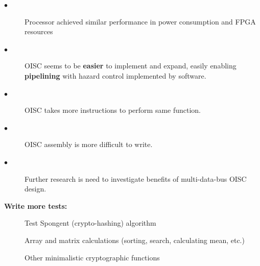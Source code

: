 \documentclass[portrait,color=UCLmidgreen,margin=1.5cm,bannerheight=8cm,logoheight=3.5cm]{uclposter}
\begin{document}
\begin{tcolorbox}[title=Results]
%	
\end{tcolorbox}

\begin{Row}\begin{Cell}{1}

\begin{tcolorbox}[title=Conclusion]
	\begin{description}
		\item[$\bullet$] Processor achieved similar performance in power consumption and FPGA resources
		\item[$\bullet$] OISC seems to be \textbf{easier} to implement and expand, easily enabling \textbf{pipelining} with hazard control implemented by software.
		\item[$\bullet$] OISC takes more instructions to perform same function.
		\item[$\bullet$] OISC assembly is more difficult to write.
		\item[$\bullet$] Further research is need to investigate benefits of multi-data-bus OISC design.
		\\[1mm]
	\end{description}
\end{tcolorbox}	

\end{Cell}\begin{Cell}{2}

\begin{tcolorbox}[title=Future work]
	\begin{multicols}{2}
		\textbf{Write more tests:}
		\begin{description}
			\item[\textendash] Test Spongent (crypto-hashing) algorithm
			\item[\textendash] Array and matrix calculations (sorting, search, calculating mean, etc.)
			\item[\textendash] Other minimalistic cryptographic functions
		\end{description}
	

\end{multicols}
\end{tcolorbox}
\end{Cell}
\end{Row}
\end{document}
